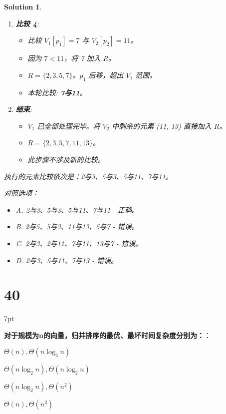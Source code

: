 \documentclass[UTF8]{report}
\newtheorem{solution}{Solution}
\theoremstyle{MyLineTheoremStyle} %
\theoremstyle{MyBlockTheoremStyle} %
\theoremstyle{MySubsubsectionStyle} %
\newenvironment{graybox}{%
        \def\FrameCommand{%
        \hspace{1pt}%
        {\color{gray}\small \vrule width 2pt}%
        {\color{graybox_color}\vrule width 4pt}%
        \colorbox{graybox_color}%
        }%
        \MakeFramed{\advance\hsize-\width\FrameRestore}%
        \noindent\hspace{-4.55pt}%
        \begin{adjustwidth}{}{7pt}%
        \vspace{2pt}\vspace{2pt}%
        }
        {%
        \vspace{2pt}\end{adjustwidth}\endMakeFramed%
        }
\begin{document}
\begin{solution}
\begin{enumerate}
    \item \textbf{比较 4}:
    \begin{itemize}
        \item 比较 $V_1[p_1]=7$ 与 $V_2[p_2]=11$。
        \item 因为 $7 < 11$，将 7 加入 $R$。
        \item $R = \{2, 3, 5, 7\}$。$p_1$ 后移，超出 $V_1$ 范围。
        \item 本轮比较: \textbf{7与11}。
    \end{itemize}

    \item \textbf{结束}:
    \begin{itemize}
        \item $V_1$ 已全部处理完毕。将 $V_2$ 中剩余的元素 (11, 13) 直接加入 $R$。
        \item $R = \{2, 3, 5, 7, 11, 13\}$。
        \item 此步骤不涉及新的比较。
    \end{itemize}
\end{enumerate}
执行的元素比较依次是：2与3、5与3、5与11、7与11。

对照选项：
\begin{itemize}
    \item A. 2与3、5与3、5与11、7与11 - 正确。
    \item B. 2与5、5与3、11与13、5与7 - 错误。
    \item C. 2与3、2与11、7与11、13与7 - 错误。
    \item D. 2与3、5与11、7与13 - 错误。
\end{itemize}
\end{solution}


\section*{40}

\begin{graybox}
\textbf{对于规模为n的向量，归并排序的最优、最坏时间复杂度分别为：}：
\begin{circledenum}
    \item $\Theta(n), \Theta(n\log_{2}n)$
    \item $\Theta(n\log_{2}n), \Theta(n\log_{2}n)$
    \item $\Theta(n\log_{2}n), \Theta(n^2)$
    \item $\Theta(n), \Theta(n^2)$
\end{circledenum}
\end{graybox}
\end{document}

